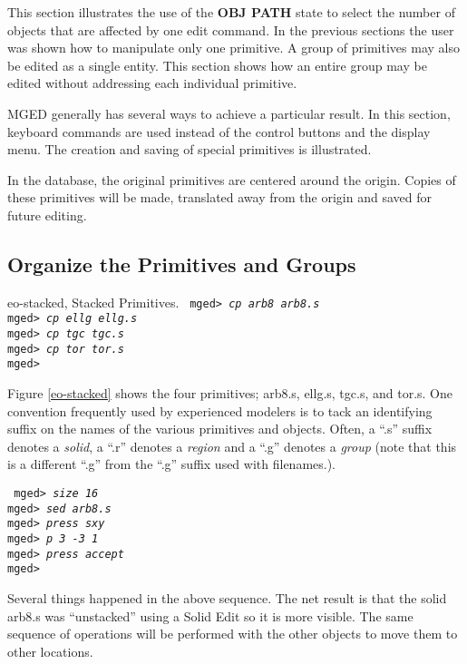 This section illustrates the use of the {\bf OBJ PATH} state to select the
number of objects that are affected by one edit command.  In the previous
sections the user was shown how to manipulate only one primitive.  A group
of primitives may also be edited as a single entity.  This section
shows how an entire group may be edited without addressing each individual
primitive.

MGED generally has several ways to achieve a particular result.  In
this section, keyboard commands are used instead of the control buttons and
the display menu.  The creation and saving of special primitives is
illustrated.

In the database, the original primitives are centered around
the origin.  Copies of these primitives will be made, translated away
from the origin and saved for future editing.

\subsection{Organize the Primitives and Groups}

\mfig eo-stacked, Stacked Primitives.
\noindent
{\tt
mged> {\em cp arb8 arb8.s}\\
mged> {\em cp ellg ellg.s}\\
mged> {\em cp tgc tgc.s}\\
mged> {\em cp tor tor.s}\\
mged>\\
}

Figure \ref{eo-stacked} shows the four primitives; arb8.s, ellg.s, tgc.s,
and tor.s.  One convention frequently used by experienced modelers is to
tack an identifying suffix on the names of the various primitives and
objects.  Often, a ``.s'' suffix denotes a {\em solid}, a ``.r'' denotes
a {\em region} and a ``.g'' denotes a {\em group} (note that this is a
different ``.g'' from the ``.g'' suffix used with filenames.).

\noindent
{\tt
mged> {\em size 16}\\
mged> {\em sed arb8.s}\\
mged> {\em press sxy}\\
mged> {\em p 3 -3 1}\\
mged> {\em press accept}\\
mged>\\
}

Several things happened in the above sequence.  The net result is that
the solid arb8.s was ``unstacked'' using a Solid Edit so it is more
visible.  The same sequence of operations will be performed with the
other objects to move them to other locations.

